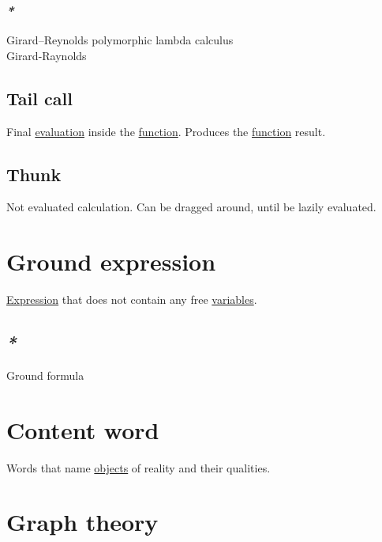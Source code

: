 \documentclass[a4paper,14pt,oneside]{book}
\begin{document}
\subsection{\emph{*}}
\label{sec:org46ca84c}

\label{orgd45f307}Girard–Reynolds polymorphic lambda calculus\\
\label{org50abae4}Girard-Raynolds\\

\section{\label{org21939da}Tail call}
\label{sec:org1e1de68}
Final \hyperref[org47e1b12]{evaluation} inside the \hyperref[org8cc2ae4]{function}. Produces the \hyperref[org8cc2ae4]{function} result.\\

\section{\label{orgddb8b5c}Thunk}
\label{sec:org0098392}
Not evaluated calculation. Can be dragged around, until be lazily evaluated.\\

\chapter{\label{org6c25504}Ground expression}
\label{sec:orgd3c9cea}
\hyperref[org6aa6989]{Expression} that does not contain any free \hyperref[org8831698]{variables}.\\

\section{\emph{*}}
\label{sec:orge948646}

\label{org6122728}Ground formula\\

\chapter{\label{orge91a328}Content word}
\label{sec:org093f02e}
Words that name \hyperref[org22f7883]{objects} of reality and their qualities.\\


\chapter{\label{orgb43dbd8}Graph theory}
\label{sec:orgc6e8869}
\end{document}
